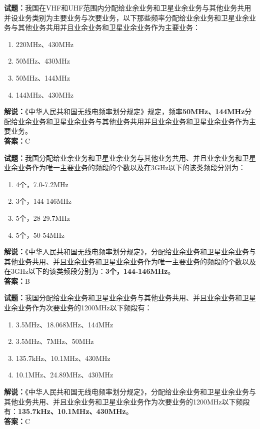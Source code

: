 \documentclass{ctexbook}
\begin{document}
\bigskip


\noindent\textbf{试题：}我国在VHF和UHF范围内分配给业余业务和卫星业余业务与其他业务共用并设业务类别为主要业务与次要业务，以下那些频率分配给业余业务和卫星业余业务与其他业务共用并且业余业务和卫星业余业务作为主要业务： 
\begin{enumerate}[leftmargin=3em]
	\item 220MHz、430MHz
	\item 50MHz、430MHz
	\item 50MHz、144MHz
	\item 144MHz、430MHz
\end{enumerate}
\noindent\textbf{解说：}《中华人民共和国无线电频率划分规定》规定，频率\textbf{50MHz、144MHz}分配给业余业务和卫星业余业务与其他业务共用并且业余业务和卫星业余业务作为主要业务。\\\noindent\textbf{答案：}C


\bigskip


\noindent\textbf{试题：}我国分配给业余业务和卫星业余业务与其他业务共用、并且业余业务和卫星业余业务作为唯一主要业务的频段的个数以及在3GHz以下的该类频段分别为：
\begin{enumerate}[leftmargin=3em]
	\item 4个，7.0-7.2MHz
	\item 3个，144-146MHz
	\item 5个，28-29.7MHz
	\item 5个，50-54MHz
\end{enumerate}
\noindent\textbf{解说：}《中华人民共和国无线电频率划分规定》，分配给业余业务和卫星业余业务与其他业务共用、并且业余业务和卫星业余业务作为唯一主要业务的频段的个数以及在3GHz以下的该类频段分别为：\textbf{3个，144-146MHz}。\\\noindent\textbf{答案：}B


\bigskip


\noindent\textbf{试题：}我国分配给业余业务和卫星业余业务与其他业务共用、并且业余业务和卫星业余业务作为次要业务的1200MHz以下频段有：
\begin{enumerate}[leftmargin=3em]
	\item 3.5MHz、18.068MHz、144MHz
	\item 3.5MHz、7MHz、50MHz
	\item 135.7kHz、10.1MHz、430MHz
	\item 10.1MHz、24.89MHz、430MHz
\end{enumerate}
\noindent\textbf{解说：}《中华人民共和国无线电频率划分规定》，分配给业余业务和卫星业余业务与其他业务共用、并且业余业务和卫星业余业务作为次要业务的1200MHz以下频段有：\textbf{135.7kHz、10.1MHz、430MHz}。\\\noindent\textbf{答案：}C
\end{document}
